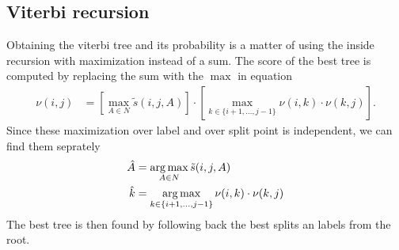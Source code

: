 
\subsection{Viterbi recursion}
Obtaining the viterbi tree and its probability is a matter of using the inside recursion with maximization instead of a sum. The score of the best tree is  computed by replacing the sum with the $\max$ in equation
\begin{align*}
\label{eq:viterbi-score}
  \nu(i,j)
    &= [ \max_{A \in N} \tilde{s}(i, j, A) ] \cdot [\max_{ k \in \{ i+1, \dots, j-1 \} } \nu(i,k) \cdot  \nu(k,j) ].
\end{align*}
Since these maximization over label and over split point is independent, we can find them seprately
\begin{align*}
\label{eq:viterbi-tree}
  \hat{A} &= \operatorname*{arg\,max}_{ A \in N } \tilde{s}(i, j, A)  \\
  \hat{k} &= \operatorname*{arg\,max}_{ k \in \{ i+1, \dots, j-1 \} } \nu(i, k) \cdot \nu(k, j)
\end{align*}
The best tree is then found by following back the best splits an labels from the root.

